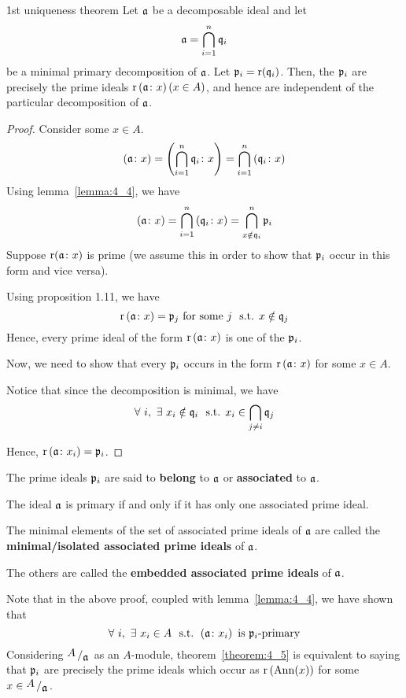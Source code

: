 \begin{theorem}{1st uniqueness theorem}{}
\label{theorem:4_5}
	Let \(\mathfrak{a}\) be a decomposable ideal and let
	\[
		\mathfrak{a} = \bigcap_{i = 1}^{n} \mathfrak{q}_i
	\]
	be a minimal primary decomposition of \(\mathfrak{a}\).
	Let \(\mathfrak{p}_i = \operatorname{r}(\mathfrak{q}_i)\).
	Then, the \(\mathfrak{p}_i\) are precisely the prime ideals
	\(\operatorname{r}\left( \mathfrak{a} \colon x \right) \left( x \in A \right)\), and hence are
	independent of the particular decomposition of \(\mathfrak{a}\).
\end{theorem}
\begin{proof}
	Consider some \(x \in A\).
	\[
		\left( \mathfrak{a} \colon x \right) = \left( \bigcap_{i = 1}^{n} \mathfrak{q}_i \colon x \right)
		= \bigcap_{i = 1}^{n} \left( \mathfrak{q}_i \colon x \right)
	\]
	Using lemma~\ref{lemma:4_4}, we have
	\[
		\left( \mathfrak{a} \colon x \right) = \bigcap_{i = 1}^{n} \left( \mathfrak{q}_i \colon x \right)
		= \bigcap_{x \notin \mathfrak{q}_i}^{n} \mathfrak{p}_i
	\]
	Suppose \(\operatorname{r}(\mathfrak{a} \colon x)\) is prime
	(we assume this in order to show that \(\mathfrak{p}_i\) occur in this form
	and vice versa).

	Using proposition 1.11, we have
	\[
		\operatorname{r}\left( \mathfrak{a} \colon x \right) = \mathfrak{p}_j \text{ for some } j
		\ \text{ s.t. } x \notin \mathfrak{q}_j
	\]
	Hence, every prime ideal of the form \(\operatorname{r}\left( \mathfrak{a} \colon x \right)\)
	is one of the \(\mathfrak{p}_i\).

	Now, we need to show that every \(\mathfrak{p}_i\) occurs in the form
	\(\operatorname{r}\left( \mathfrak{a} \colon x \right)\) for some \(x \in A\).

	Notice that since the decomposition is minimal, we have
	\[
		\forall\ i, \ \exists\ x_i \notin \mathfrak{q}_i \ \text{ s.t. }
		x_i \in \bigcap_{j \neq i} \mathfrak{q}_j
	\]

	Hence, \(\operatorname{r}\left( \mathfrak{a} \colon x_i \right) = \mathfrak{p}_i\).
\end{proof}

\begin{note}
	The prime ideals \(\mathfrak{p}_i\) are said to \textbf{belong} to \(\mathfrak{a}\)
	or \textbf{associated} to \(\mathfrak{a}\).

	The ideal \(\mathfrak{a}\) is primary if and only if it has only one
	associated prime ideal.

	The minimal elements of the set of associated prime ideals of \(\mathfrak{a}\)
	are called the \textbf{minimal/isolated
	associated prime ideals} of \(\mathfrak{a}\).

	The others are called the \textbf{embedded associated prime ideals}
	of \(\mathfrak{a}\).
\end{note}

\begin{note}
	Note that in the above proof, coupled with lemma~\ref{lemma:4_4},
	we have shown that
	\[
		\forall\ i, \ \exists\ x_i \in A \ \text{ s.t. }
		\left( \mathfrak{a} \colon x_i \right) \text{ is } \mathfrak{p}_i \text{-primary}
	\]
	Considering \(\bigslant{A}{\mfa}\) as an \(A\)-module,
	theorem~\ref{theorem:4_5} is equivalent to saying that
	\(\mathfrak{p}_i\) are precisely the prime ideals which occur as
	\(\operatorname{r}\left( \operatorname{Ann}(x) \right)\) for some	\(x \in \bigslant{A}{\mfa}\).
\end{note}


